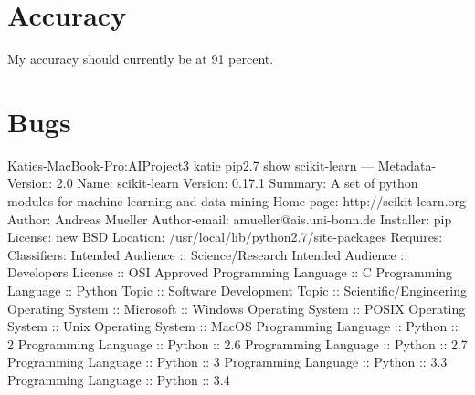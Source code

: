 \documentclass[a4paper, 11pt]{article}
\begin{document}
\section*{Accuracy}
My accuracy should currently be at 91 percent.

\section*{Bugs}
Katies-MacBook-Pro:AIProject3 katie pip2.7 show scikit-learn
---
Metadata-Version: 2.0
Name: scikit-learn
Version: 0.17.1
Summary: A set of python modules for machine learning and data mining
Home-page: http://scikit-learn.org
Author: Andreas Mueller
Author-email: amueller@ais.uni-bonn.de
Installer: pip
License: new BSD
Location: /usr/local/lib/python2.7/site-packages
Requires: 
Classifiers:
  Intended Audience :: Science/Research
  Intended Audience :: Developers
  License :: OSI Approved
  Programming Language :: C
  Programming Language :: Python
  Topic :: Software Development
  Topic :: Scientific/Engineering
  Operating System :: Microsoft :: Windows
  Operating System :: POSIX
  Operating System :: Unix
  Operating System :: MacOS
  Programming Language :: Python :: 2
  Programming Language :: Python :: 2.6
  Programming Language :: Python :: 2.7
  Programming Language :: Python :: 3
  Programming Language :: Python :: 3.3
  Programming Language :: Python :: 3.4
\end{document}
